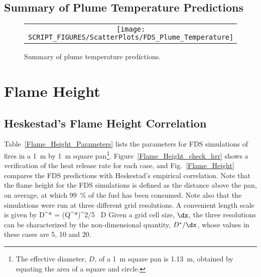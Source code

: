 \clearpage


\subsection{Summary of Plume Temperature Predictions}
\label{Plume Temperature}



\begin{figure}[h!]
\begin{center}
\begin{tabular}{c}
\texttt{[image: SCRIPT\_FIGURES/ScatterPlots/FDS\_Plume\_Temperature]}
\end{tabular}
\end{center}
\caption[Summary of plume temperature predictions]
{Summary of plume temperature predictions.}
\label{Plume_Summary}
\end{figure}

\clearpage


\section{Flame Height}

\subsection{Heskestad's Flame Height Correlation}

Table~\ref{Flame_Height_Parameters} lists the parameters for FDS simulations of fires in a 1~m by 1~m square pan\footnote{The effective diameter, $D$, of a 1~m square pan is 1.13~m, obtained by equating the area of a square and circle.}. Figure~\ref{Flame_Height_check_hrr} shows a verification of the heat release rate for each case, and Fig.~\ref{Flame_Height} compares the FDS predictions with Heskestad's empirical correlation. Note that the flame height for the FDS simulations is defined as the distance above the pan, on average, at which 99~\% of the fuel has been consumed. Note also that the simulations were run at three different grid resolutions. A convenient length scale is given by
\be
   D^* = (Q^*)^{2/5} \, D
\ee
Given a grid cell size, $\dx$, the three resolutions can be characterized by the non-dimensional quantity, $D^*/\dx$, whose values in these cases are 5, 10 and 20.

